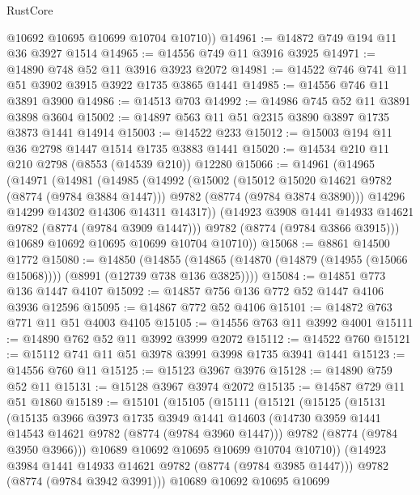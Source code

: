 \begin{lexlean}{RustCore}
\begin{coremodule}
        @10692
        @10695
        @10699
        @10704
        @10710))
@14961 := @14872 @749 @194 @11 @36 @3927 @1514
@14965 := @14556 @749 @11 @3916 @3925
@14971 := @14890 @748 @52 @11 @3916 @3923 @2072
@14981 := @14522 @746 @741 @11 @51 @3902 @3915 @3922 @1735 @3865 @1441
@14985 := @14556 @746 @11 @3891 @3900
@14986 := @14513 @703
@14992 := @14986 @745 @52 @11 @3891 @3898 @3604
@15002 := @14897 @563 @11 @51 @2315 @3890 @3897 @1735 @3873 @1441 @14914
@15003 := @14522 @233
@15012 := @15003 @194 @11 @36 @2798 @1447 @1514 @1735 @3883 @1441
@15020 := @14534 @210 @11 @210 @2798 (@8553 (@14539 @210)) @12280
@15066 := @14961
    (@14965
      (@14971
        (@14981
          (@14985
            (@14992
              (@15002
                (@15012 @15020 @14621 @9782 (@8774 (@9784 @3884 @1447)))
                @9782
                (@8774 (@9784 @3874 @3890)))
              @14296
              @14299
              @14302
              @14306
              @14311
              @14317))
          (@14923 @3908 @1441 @14933 @14621 @9782 (@8774 (@9784 @3909 @1447)))
          @9782
          (@8774 (@9784 @3866 @3915)))
        @10689
        @10692
        @10695
        @10699
        @10704
        @10710))
@15068 := @8861 @14500 @1772
@15080 := @14850
    (@14855 (@14865 (@14870 (@14879 (@14955 (@15066 @15068)))) (@8991 (@12739 @738 @136 @3825))))
@15084 := @14851 @773 @136 @1447 @4107
@15092 := @14857 @756 @136 @772 @52 @1447 @4106 @3936 @12596
@15095 := @14867 @772 @52 @4106
@15101 := @14872 @763 @771 @11 @51 @4003 @4105
@15105 := @14556 @763 @11 @3992 @4001
@15111 := @14890 @762 @52 @11 @3992 @3999 @2072
@15112 := @14522 @760
@15121 := @15112 @741 @11 @51 @3978 @3991 @3998 @1735 @3941 @1441
@15123 := @14556 @760 @11
@15125 := @15123 @3967 @3976
@15128 := @14890 @759 @52 @11
@15131 := @15128 @3967 @3974 @2072
@15135 := @14587 @729 @11 @51 @1860
@15189 := @15101
    (@15105
      (@15111
        (@15121
          (@15125
            (@15131
              (@15135
                @3966
                @3973
                @1735
                @3949
                @1441
                @14603
                (@14730 @3959 @1441 @14543 @14621 @9782 (@8774 (@9784 @3960 @1447)))
                @9782
                (@8774 (@9784 @3950 @3966)))
              @10689
              @10692
              @10695
              @10699
              @10704
              @10710))
          (@14923 @3984 @1441 @14933 @14621 @9782 (@8774 (@9784 @3985 @1447)))
          @9782
          (@8774 (@9784 @3942 @3991)))
        @10689
        @10692
        @10695
        @10699

\end{coremodule}
\end{lexlean}
